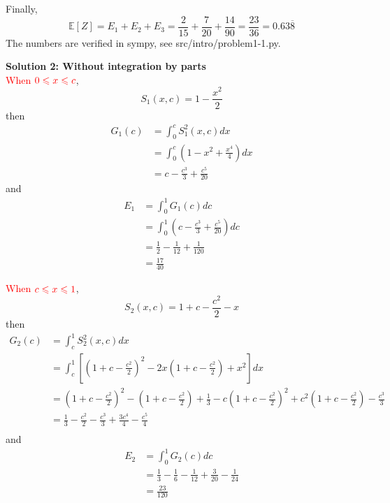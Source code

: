 \documentclass[12pt]{simple_doc}
\begin{document}
    Finally,
    \begin{equation*}
        \mathbb{E}[Z] = E_1 + E_2 + E_3 = \frac{2}{15} + \frac{7}{20} + \frac{14}{90}
                      = \frac{23}{36} = 0.63\overline{8}
    \end{equation*}
    The numbers are verified in sympy, see src/intro/problem1-1.py.

    \medskip
    \textbf{Solution 2: Without integration by parts}\\
    \textcolor{red}{When} $\color{red} 0 \leqslant x \leqslant c$,
    \begin{equation*}
        S_1(x, c) = 1 - \frac{x^2}{2}
    \end{equation*}
    then
    \begin{equation*}
		\begin{aligned}
		G_1(c) &= \int_0^c S_1^2(x, c) dx \\
		   &= \int_0^c (1 - x^2 + \frac{x^4}{4}) dx\\
           &= c - \frac{c^3}{3} + \frac{c^5}{20}
		\end{aligned}
	\end{equation*}
    and
    \begin{equation*}
		\begin{aligned}
		E_1 &= \int_0^1 G_1(c) dc \\
		   &= \int_0^1 ( c - \frac{c^3}{3} + \frac{c^5}{20}) dc\\
           &= \frac{1}{2} - \frac{1}{12} + \frac{1}{120}\\
           &= \frac{17}{40}
		\end{aligned}
	\end{equation*}

    \textcolor{red}{When} $\color{red} c \leqslant x \leqslant 1$,
    \begin{equation*}
        S_2(x, c) = 1 + c - \frac{c^2}{2} - x
    \end{equation*}
    then
    \begin{equation*}
		\begin{aligned}
		G_2(c) &= \int_c^1 S_2^2(x, c) dx \\
		   &= \int_c^1 [(1 + c - \frac{c^2}{2})^2 - 2x(1 + c - \frac{c^2}{2}) + x^2] dx\\
           &= (1 + c - \frac{c^2}{2})^2 - (1 + c - \frac{c^2}{2}) + \frac{1}{3}
             - c(1 + c - \frac{c^2}{2})^2 + c^2(1 + c - \frac{c^2}{2}) - \frac{c^3}{3}\\
           &= \frac{1}{3} - \frac{c^2}{2} - \frac{c^3}{3} + \frac{3c^4}{4} - \frac{c^5}{4}\\
		\end{aligned}
	\end{equation*}
    and
    \begin{equation*}
		\begin{aligned}
		E_2 &= \int_0^1 G_2(c) dc \\
		   &= \frac{1}{3} - \frac{1}{6} - \frac{1}{12} + \frac{3}{20} - \frac{1}{24}\\
           &= \frac{23}{120}
		\end{aligned}
	\end{equation*}
\end{document}
